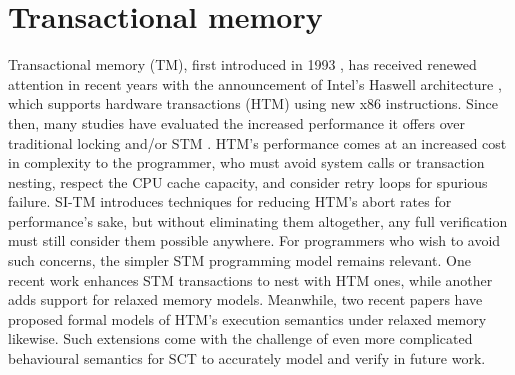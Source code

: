 \section{Transactional memory}

Transactional memory (TM), first introduced in 1993 \cite{transactional-memory},
has received renewed attention in recent years with the announcement of Intel's Haswell architecture \cite{htm-haswell},
which supports hardware transactions (HTM) using new x86 instructions.
Since then, many studies have evaluated the increased performance it offers over traditional locking and/or STM
\cite{htm-experience,htm-performance,tm-benchmark-cmu}.
%
HTM's performance comes at an increased cost in complexity to the programmer,
who must avoid system calls or transaction nesting, respect the CPU cache capacity,
and consider retry loops for spurious failure.
SI-TM \cite{si-tm} introduces techniques for reducing HTM's abort rates for performance's sake,
but without eliminating them altogether, any full verification must still consider them possible anywhere.
For programmers who wish to avoid such concerns,
the simpler STM programming model remains relevant.
One recent work \cite{hybrid-htm-stm} enhances STM transactions to nest with HTM ones,
while another \cite{stm-relaxed-memory} adds support for relaxed memory models.
Meanwhile, two recent papers \cite{relaxed-transactions-pldi,relaxed-transactions-popl}
have proposed formal models of HTM's execution semantics under relaxed memory likewise.
Such extensions come with the challenge of even more complicated behavioural semantics
for SCT to accurately model and verify in future work.


